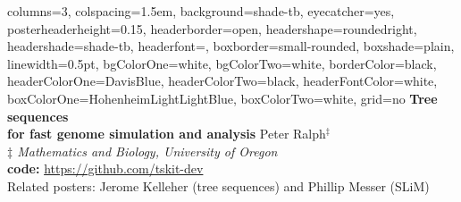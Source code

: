 \documentclass[fontscale=0.38,a0paper]{baposter}
\begin{document}
\newlength{\leftimgwidth}
\begin{poster}%
  {
  columns=3,
  colspacing=1.5em,
  background=shade-tb,
  eyecatcher=yes,
  posterheaderheight=0.15\textheight,
  headerborder=open,
  headershape=roundedright,
  headershade=shade-tb,
  headerfont=\Large\textsf, %
  boxborder=small-rounded,
  boxshade=plain,
  linewidth=0.5pt,
  bgColorOne=white,
  bgColorTwo=white,
  borderColor=black,
  headerColorOne=DavisBlue,
  headerColorTwo=black,
  headerFontColor=white,
  boxColorOne=HohenheimLightLightBlue,
  boxColorTwo=white,
  grid=no
  }
  {
  }
  {\sf %
  \vspace{0.5em}
     \textbf{\textcolor{DavisBlue}{Tree sequences \\ for fast genome simulation and analysis}}\vspace{0.5em}}
  {\sf %
    Peter Ralph$^{\ddagger}$ \\  \vspace{-1.0mm}
    {\small \textit{$\ddagger$ Mathematics and Biology, University of Oregon} }\\
    {\textbf{code:}  \url{https://github.com/tskit-dev} }\\
    \vspace{0.8em}
    {Related posters: Jerome Kelleher (tree sequences) and Phillip Messer (SLiM)}
  }
  {
  }


\end{poster}
\end{document}
